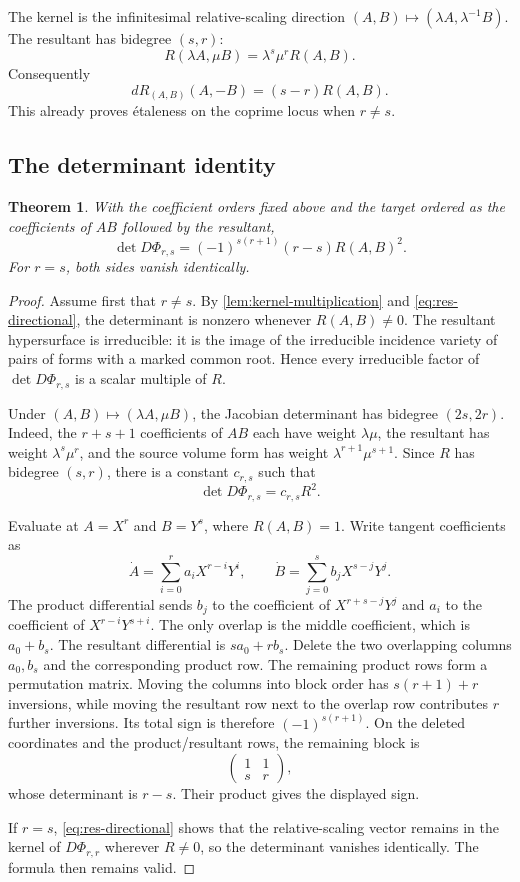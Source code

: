 \documentclass[11pt,reqno]{amsart}
\newtheorem{theorem}{Theorem}[section]
\theoremstyle{definition}
\theoremstyle{remark}
\begin{document}
The kernel is the infinitesimal relative-scaling direction
$(A,B)\mapsto(\lambda A,\lambda^{-1}B)$.  The resultant has bidegree
$(s,r)$:
\[
 R(\lambda A,\mu B)=\lambda^s\mu^r R(A,B).
\]
Consequently
\begin{equation}\label{eq:res-directional}
 dR_{(A,B)}(A,-B)=(s-r)R(A,B).
\end{equation}
This already proves étaleness on the coprime locus when $r\ne s$.

\subsection{The determinant identity}

\begin{theorem}\label{thm:determinant}
With the coefficient orders fixed above and the target ordered as the
coefficients of $AB$ followed by the resultant,
\[
 \boxed{
 \det D\Phi_{r,s}
 =(-1)^{s(r+1)}(r-s)R(A,B)^2.}
\]
For $r=s$, both sides vanish identically.
\end{theorem}

\begin{proof}
Assume first that $r\ne s$.  By \cref{lem:kernel-multiplication} and
\eqref{eq:res-directional}, the determinant is nonzero whenever
$R(A,B)\ne0$.  The resultant hypersurface is irreducible: it is the image
of the irreducible incidence variety of pairs of forms with a marked
common root.  Hence every irreducible factor of $\det D\Phi_{r,s}$ is a
scalar multiple of $R$.

Under $(A,B)\mapsto(\lambda A,\mu B)$, the Jacobian determinant has
bidegree $(2s,2r)$.  Indeed, the $r+s+1$ coefficients of $AB$ each have
weight $\lambda\mu$, the resultant has weight $\lambda^s\mu^r$, and the
source volume form has weight $\lambda^{r+1}\mu^{s+1}$.  Since $R$ has
bidegree $(s,r)$, there is a constant $c_{r,s}$ such that
\[
 \det D\Phi_{r,s}=c_{r,s}R^2.
\]

Evaluate at $A=X^r$ and $B=Y^s$, where $R(A,B)=1$.  Write tangent
coefficients as
\[
 \dot A=\sum_{i=0}^r a_iX^{r-i}Y^i,
 \qquad
 \dot B=\sum_{j=0}^s b_jX^{s-j}Y^j.
\]
The product differential sends $b_j$ to the coefficient of
$X^{r+s-j}Y^j$ and $a_i$ to the coefficient of
$X^{r-i}Y^{s+i}$.  The only overlap is the middle coefficient, which is
$a_0+b_s$.  The resultant differential is $sa_0+rb_s$.  Delete the two overlapping columns $a_0,b_s$ and the corresponding
product row.  The remaining product rows form a permutation matrix.  Moving the
columns into block order has $s(r+1)+r$ inversions, while moving the
resultant row next to the overlap row contributes $r$ further inversions.
Its total sign is therefore $(-1)^{s(r+1)}$.  On
the deleted coordinates and the product/resultant rows, the remaining
block is
\[
 \begin{pmatrix}1&1\\ s&r\end{pmatrix},
\]
whose determinant is $r-s$.  Their product gives the displayed sign.

If $r=s$, \eqref{eq:res-directional} shows that the relative-scaling
vector remains in the kernel of $D\Phi_{r,r}$ wherever $R\ne0$, so the
determinant vanishes identically.  The formula then remains valid.
\end{proof}
\end{document}
